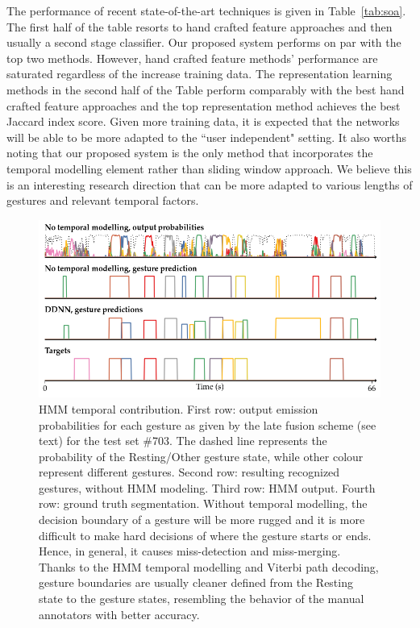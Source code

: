 The performance of recent state-of-the-art techniques is given in Table~\ref{tab:soa}. The first half of the table resorts to hand crafted feature approaches and then usually a second stage classifier. Our proposed system performs on par with the top two methods. However, hand crafted feature methods' performance are saturated regardless of the increase training data. The representation learning methods in the second half of the Table perform comparably with the best hand crafted feature approaches and the top representation method achieves the best Jaccard index score. Given more training data, it is expected that the networks will be able to be more adapted to the ``user independent" setting. It also worths noting that our proposed system is the only method that incorporates the temporal modelling element rather than sliding window approach. We believe this is an interesting research direction that can be more adapted to various lengths of gestures and relevant temporal factors.

%


\begin{figure}[t]
  \centering
  \includegraphics[width=.7\textwidth]{images/output.png}
  \caption{
  \small{HMM temporal contribution. 
First row: output emission probabilities for each gesture as given by the late fusion scheme (see text) for the test set \#703. 
The dashed line represents the probability of the Resting/Other gesture state, 
while other colour represent different gestures. 
Second row: resulting recognized gestures, without HMM modeling.
Third row: HMM output.
Fourth row: ground truth segmentation.
%
Without temporal modelling, the decision boundary of a gesture will be more rugged and it is more difficult to make 
hard decisions of where the gesture starts or ends. Hence, in general, 
it causes miss-detection and miss-merging. 
%
Thanks to the HMM temporal modelling and Viterbi path decoding, gesture boundaries 
are usually cleaner defined from the Resting state to the gesture states, 
resembling the behavior of the manual annotators with better accuracy.
}
}
    \label{fig:temporalModellingComparision}
\end{figure}

